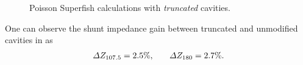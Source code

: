 \documentclass[a4paper,oneside,12pt]{report}
\numberwithin{equation}{chapter}
\begin{document}
\begin{figure}[H]
    \centering
    \vspace{20pt}
    \vspace{20pt}
    \caption{\centering Poisson Superfish calculations with \textit{truncated} cavities.} 
    \label{fig:180_cavity_shunt_diff}
\end{figure}
One can observe the shunt impedance gain between truncated and unmodified cavities in  as
\vspace{-10pt}\begin{equation}
    \begin{aligned}
        \Delta Z_{107.5}=2.5\%   ,
    \end{aligned}
    \qquad
    \begin{aligned}
        \Delta Z_{180}=2.7\% .
    \end{aligned}
\vspace{-10pt}\end{equation}


\clearpage
\end{document}
